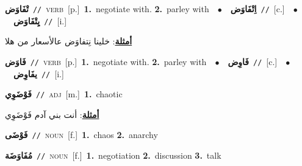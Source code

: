\documentclass[10pt,a4paper,twoside]{article} %
\begin{document}
\begin{multicols}{2}
{\setlength\topsep{0pt}\textbf{\foreignlanguage{arabic}{تْفَاوَض}}\ {\color{gray}\texttt{//}\color{black}}\ \textsc{verb}\ [p.]\ \textbf{1.}~negotiate with.  \textbf{2.}~parley with\ \ $\bullet$\ \ \setlength\topsep{0pt}\textbf{\foreignlanguage{arabic}{اِتْفَاوَض}}\ {\color{gray}\texttt{//}\color{black}}\ [c.]\ \ $\bullet$\ \ \setlength\topsep{0pt}\textbf{\foreignlanguage{arabic}{يِتْفَاوَض}}\ {\color{gray}\texttt{//}\color{black}}\ [i.]\  \begin{flushright}\color{gray}\foreignlanguage{arabic}{\textbf{\underline{\foreignlanguage{arabic}{أمثلة}}}: خلينا نِتفاوَض عالأسعار من هلا}\end{flushright}\color{black}} \vspace{2mm}

{\setlength\topsep{0pt}\textbf{\foreignlanguage{arabic}{فَاوَض}}\ {\color{gray}\texttt{//}\color{black}}\ \textsc{verb}\ [p.]\ \textbf{1.}~negotiate with.  \textbf{2.}~parley with\ \ $\bullet$\ \ \setlength\topsep{0pt}\textbf{\foreignlanguage{arabic}{فَاوِض}}\ {\color{gray}\texttt{//}\color{black}}\ [c.]\ \ $\bullet$\ \ \setlength\topsep{0pt}\textbf{\foreignlanguage{arabic}{يفَاوِض}}\ {\color{gray}\texttt{//}\color{black}}\ [i.]\ } \vspace{2mm}

{\setlength\topsep{0pt}\textbf{\foreignlanguage{arabic}{فَوْضَوِي}}\ {\color{gray}\texttt{//}\color{black}}\ \textsc{adj}\ [m.]\ \textbf{1.}~chaotic\  \begin{flushright}\color{gray}\foreignlanguage{arabic}{\textbf{\underline{\foreignlanguage{arabic}{أمثلة}}}: أنت بني آدم فَوْضَوِي}\end{flushright}\color{black}} \vspace{2mm}

{\setlength\topsep{0pt}\textbf{\foreignlanguage{arabic}{فَوْضَى}}\ {\color{gray}\texttt{//}\color{black}}\ \textsc{noun}\ [f.]\ \textbf{1.}~chaos  \textbf{2.}~anarchy\ } \vspace{2mm}

{\setlength\topsep{0pt}\textbf{\foreignlanguage{arabic}{مُفَاوَضَة}}\ {\color{gray}\texttt{//}\color{black}}\ \textsc{noun}\ [f.]\ \textbf{1.}~negotiation  \textbf{2.}~discussion  \textbf{3.}~talk\ } \vspace{2mm}


\end{multicols}
\end{document}
